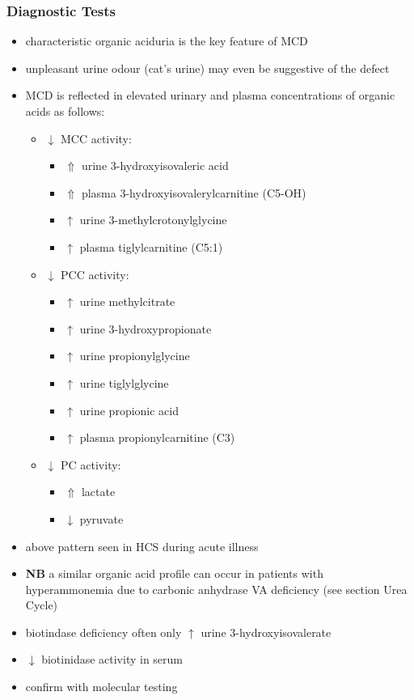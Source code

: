 \documentclass{scrartcl}
\begin{document}
\subsubsection{Diagnostic Tests}
\label{sec:orge68bd3c}
\begin{itemize}
\item characteristic organic aciduria is the key feature of MCD
\item unpleasant urine odour (cat’s urine) may even be suggestive of the
defect
\item MCD is reflected in elevated urinary and plasma concentrations of
organic acids as follows:
\begin{itemize}
\item \(\downarrow\) MCC activity:
\begin{itemize}
\item \(\Uparrow\) urine 3-hydroxyisovaleric acid
\item \(\Uparrow\) plasma 3-hydroxyisovalerylcarnitine (C5-OH)
\item \(\uparrow\) urine 3-methylcrotonylglycine
\item \(\uparrow\) plasma tiglylcarnitine (C5:1)
\end{itemize}
\item \(\downarrow\) PCC activity:
\begin{itemize}
\item \(\uparrow\) urine methylcitrate
\item \(\uparrow\) urine 3-hydroxypropionate
\item \(\uparrow\) urine propionylglycine
\item \(\uparrow\) urine tiglylglycine
\item \(\uparrow\) urine propionic acid
\item \(\uparrow\) plasma propionylcarnitine (C3)
\end{itemize}
\item \(\downarrow\) PC activity:
\begin{itemize}
\item \(\Uparrow\) lactate
\item \(\downarrow\) pyruvate
\end{itemize}
\end{itemize}
\item above pattern seen in HCS during acute illness
\item \textbf{NB} a similar organic acid profile can occur in patients with
hyperammonemia due to carbonic anhydrase VA deficiency (see section Urea Cycle)
\item biotindase deficiency often only \(\uparrow\) urine 3-hydroxyisovalerate
\item \(\downarrow\) biotinidase activity in serum
\item confirm with molecular testing
\end{itemize}
\end{document}
